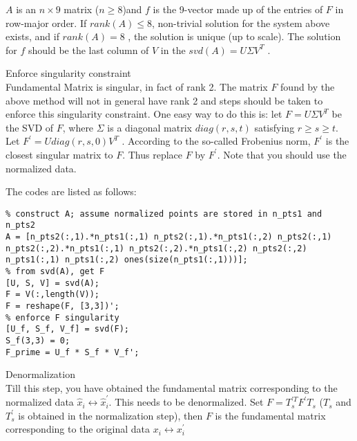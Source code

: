 \begin{questions}
\begin{parts}
\begin{subparts}
    $A$ is an $n \times 9$ matrix ($n \geq 8$)and $f$ is the 9-vector made up of the entries of $F$ in row-major order. If $rank(A) \leq 8$, non-trivial solution for the system above exists, and if $rank (A) = 8$ , the solution is unique (up to scale). The solution for $f$ should be the last column of $V$ in the $svd(A) = U \Sigma V^{T}$ .
    
    \subpart
    Enforce singularity constraint\\
    Fundamental Matrix is singular, in fact of rank 2. The matrix $F$ found by the above method will not in general have rank 2 and steps should be taken to enforce this singularity constraint. One easy way to do this is: let $F=U \Sigma V^{T}$ be the SVD of $F$, where $\Sigma$ is a diagonal matrix $diag(r,s,t)$ satisfying $r \geq s \geq t$. Let
    $F^{\prime}=U diag(r,s,0) V^{T}$ . According to the so-called Frobenius norm, $F^{\prime}$ is the closest singular matrix to $F$. Thus replace $F$ by $F^{\prime}$. Note that you should use the normalized data.
    \begin{solution}
        The codes are listed as follows:
        \begin{lstlisting}
% construct A; assume normalized points are stored in n_pts1 and n_pts2
A = [n_pts2(:,1).*n_pts1(:,1) n_pts2(:,1).*n_pts1(:,2) n_pts2(:,1) n_pts2(:,2).*n_pts1(:,1) n_pts2(:,2).*n_pts1(:,2) n_pts2(:,2) n_pts1(:,1) n_pts1(:,2) ones(size(n_pts1(:,1)))];
% from svd(A), get F
[U, S, V] = svd(A);
F = V(:,length(V));
F = reshape(F, [3,3])';
% enforce F singularity
[U_f, S_f, V_f] = svd(F);
S_f(3,3) = 0;
F_prime = U_f * S_f * V_f';
        \end{lstlisting}
    \end{solution}
    
    \subpart
    Denormalization\\
    Till this step, you have obtained the fundamental matrix corresponding to the normalized data $\hat {  { x } } _ { i } \leftrightarrow \hat { { x } } ^ {\prime}_ { i }$. This needs to be denormalized. Set $F = T_{s} ^ {\prime T } F ^ { \prime } T_{s}$ ($T_{s}$ and $T_{s} ^ {\prime}$ is obtained in the normalization step), then $F$ is the fundamental matrix corresponding to the original data $ {  { x } } _ { i } \leftrightarrow  { { x } } ^ {\prime}_ { i }$
    

\end{subparts}
\end{parts}
\end{questions}
